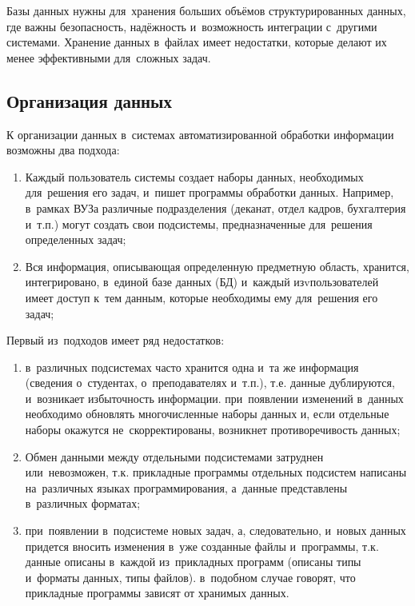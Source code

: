 \documentclass{ou}
\begin{document}
Базы данных нужны для~хранения больших объёмов структурированных данных, где важны безопасность, надёжность и~возможность интеграции с~другими системами. Хранение данных в~файлах имеет недостатки, которые делают их менее эффективными для~сложных задач.

\subsection{Организация данных}
К организации данных в~системах автоматизированной обработки информации возможны два подхода: 
\begin{enumerate}[itemindent=4em, nosep, label=\arabic*)]
\item Каждый пользователь системы создает наборы данных, необходимых для~решения его задач, и~пишет программы обработки данных. Например, в~рамках ВУЗа различные подразделения (деканат, отдел кадров, бухгалтерия и~т.п.) могут создать свои подсистемы, предназначенные для~решения определенных задач;
\item Вся информация, описывающая определенную предметную область, хранится, интегрировано, в~единой базе данных (БД) и~каждый изvпользователей имеет доступ к~тем данным, которые необходимы ему для~решения его задач;
\end{enumerate}

Первый из~подходов имеет ряд недостатков:
\begin{enumerate}[itemindent=4em, nosep, label=\arabic*)]
\item в~различных подсистемах часто хранится одна и~та же информация (сведения о~студентах, о~преподавателях и~т.п.), т.е. данные дублируются, и~возникает избыточность информации. при~появлении изменений в~данных необходимо обновлять многочисленные наборы данных и, если отдельные наборы окажутся не~скорректированы, возникнет противоречивость данных;
\item Обмен данными между отдельными подсистемами затруднен или~невозможен, т.к. прикладные программы отдельных подсистем написаны на~различных языках программирования, а~данные представлены в~различных форматах;
\item при~появлении в~подсистеме новых задач, а, следовательно, и~новых данных придется вносить изменения в~уже созданные файлы и~программы, т.к. данные описаны в~каждой из~прикладных программ (описаны типы и~форматы данных, типы файлов). в~подобном случае говорят, что прикладные программы зависят от хранимых данных.
\end{enumerate}
\end{document}
